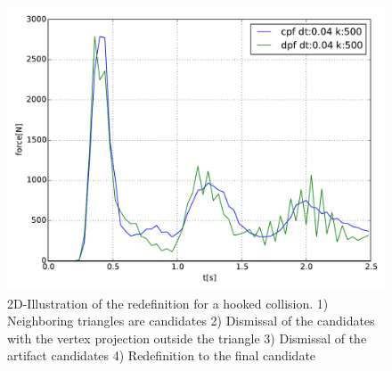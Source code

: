 \begin{figure}[h] 
  \centering
     \includegraphics[width=1.0\textwidth]{pics/pdf/slidingVertexArtifactDiscretizationForcesRedefAlgo.pdf}
  \caption[2D-Illustration of the redefinition for a hooked collision.]{2D-Illustration of the redefinition for a hooked collision. 1) Neighboring triangles are candidates 2) Dismissal of the candidates with the vertex projection outside the triangle 3) Dismissal of the artifact candidates 4) Redefinition to the final candidate}
  \label{fig::slidingVertexArtifactDiscretizationForcesRedefAlgo}
\end{figure}
